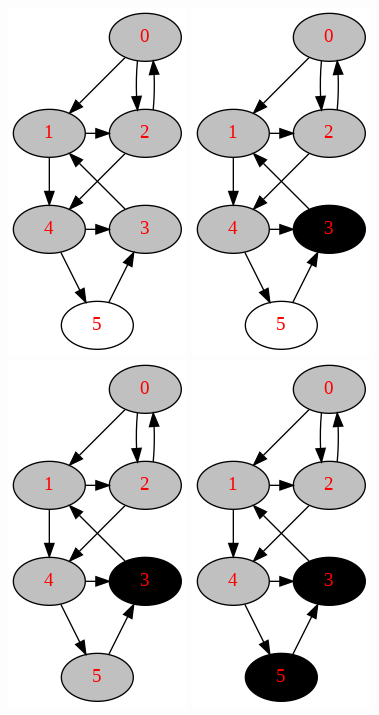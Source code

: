 \documentclass[main.tex]{subfiles}
\begin{document}
\begin{figure}[!ht]
     \includegraphics[width=0.2\columnwidth]{fig/depth_first_graph_search_process4.png}
    \includegraphics[width=0.2\columnwidth]{fig/depth_first_graph_search_process5.png}
    \includegraphics[width=0.2\columnwidth]{fig/depth_first_graph_search_process6.png}
    \includegraphics[width=0.2\columnwidth]{fig/depth_first_graph_search_process7.png}
    

\end{figure}
\end{document}
